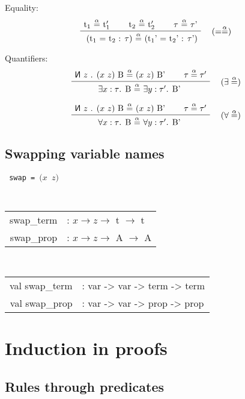 \documentclass[twoside,a4paper]{article}
\theoremstyle{definition}
\newcommand\new[0]{\reflectbox{\ensuremath{\mathsf{N}}}}
\begin{document}
Equality:
\[
\AxiomC{t$_1$ $\overset{\alpha}=$ t$_1'$}
\AxiomC{t$_2$ $\overset{\alpha}=$ t$_2'$}
\AxiomC{$\tau$ $\overset{\alpha}=$ $\tau$'}
\RightLabel{\quad ($=\overset{\alpha}=$)}
\TrinaryInfC{ (t$_1$ = t$_2$ : $\tau$) $\overset{\alpha}=$ (t$_1$' = t$_2$' : $\tau$')}
\DisplayProof
\]

Quantifiers:
\[
\AxiomC{$\new$ $z$ . $(x$ $z)$ B $\overset{\alpha}=$ $(x$ $z)$ B'}
\AxiomC{$\tau \overset{\alpha}= \tau'$}
\RightLabel{\quad ($\exists\overset{\alpha}=$)}
\BinaryInfC{$\exists x : \tau$. B $\overset{\alpha}=$ $\exists y : \tau' $. B' }
\DisplayProof
\]

\[
\AxiomC{$\new$ $z$ . $(x$ $z)$ B $\overset{\alpha}=$ $(x$ $z)$ B'}
\AxiomC{$\tau \overset{\alpha}= \tau'$}
\RightLabel{\quad ($\forall\overset{\alpha}=$)}
\BinaryInfC{$\forall x : \tau$. B $\overset{\alpha}=$ $\forall y : \tau' $. B' }
\DisplayProof
\]

\subsection{Swapping variable names}

\begin{center}
{\tt
swap = $(x$ $z)$
}
\end{center}

\begin{center}
{\tt
\begin{tabular}{rl}
swap_term &: $x \rightarrow z \rightarrow $ t $\rightarrow$ t
\\
swap_prop &: $x \rightarrow z \rightarrow $ A $\rightarrow$ A
\end{tabular}
}
\end{center}

\begin{center}
{\tt
\begin{tabular}{rl}
val swap_term &: var -> var -> term -> term
\\
val swap_prop &: var -> var -> prop -> prop
\end{tabular}
}
\end{center}

\section{Induction in proofs}

\subsection{Rules through predicates}
\end{document}
